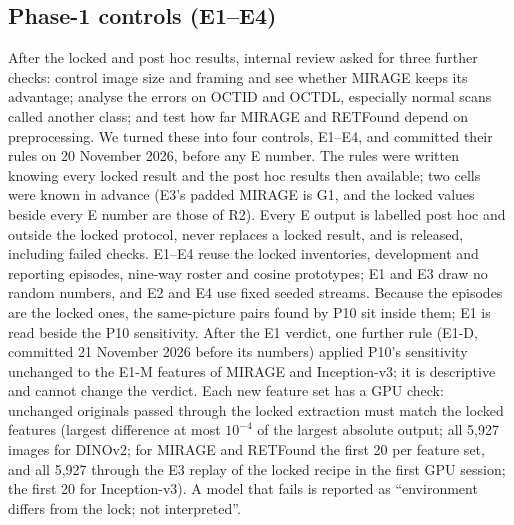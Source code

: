\documentclass[conference]{IEEEtran}
\begin{document}
\subsection{Phase-1 controls (E1--E4)}
\label{sec:phase1}
After the locked and post hoc results, internal review asked for three further checks: control image size and framing and see whether MIRAGE keeps its advantage; analyse the errors on OCTID and OCTDL, especially normal scans called another class; and test how far MIRAGE and RETFound depend on preprocessing. We turned these into four controls, E1--E4, and committed their rules on 20 November 2026, before any E number. The rules were written knowing every locked result and the post hoc results then available; two cells were known in advance (E3's padded MIRAGE is G1, and the locked values beside every E number are those of R2). Every E output is labelled post hoc and outside the locked protocol, never replaces a locked result, and is released, including failed checks. E1--E4 reuse the locked inventories, development and reporting episodes, nine-way roster and cosine prototypes; E1 and E3 draw no random numbers, and E2 and E4 use fixed seeded streams. Because the episodes are the locked ones, the same-picture pairs found by P10 sit inside them; E1 is read beside the P10 sensitivity. After the E1 verdict, one further rule (E1-D, committed 21 November 2026 before its numbers) applied P10's sensitivity unchanged to the E1-M features of MIRAGE and Inception-v3; it is descriptive and cannot change the verdict. Each new feature set has a GPU check: unchanged originals passed through the locked extraction must match the locked features (largest difference at most $10^{-4}$ of the largest absolute output; all 5,927 images for DINOv2; for MIRAGE and RETFound the first 20 per feature set, and all 5,927 through the E3 replay of the locked recipe in the first GPU session; the first 20 for Inception-v3). A model that fails is reported as ``environment differs from the lock; not interpreted''.
\end{document}

